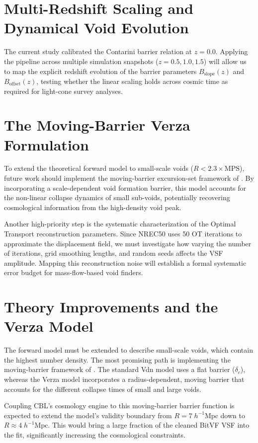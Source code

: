 \documentclass[12pt]{report}
\begin{document}
\section{Multi-Redshift Scaling and Dynamical Void Evolution}

The current study calibrated the Contarini barrier relation at $z=0.0$. Applying the pipeline across multiple simulation snapshots ($z = 0.5, 1.0, 1.5$) will allow us to map the explicit redshift evolution of the barrier parameters $B_{\mathrm{slope}}(z)$ and $B_{\mathrm{offset}}(z)$, testing whether the linear scaling holds across cosmic time as required for light-cone survey analyses.

\section{The Moving-Barrier Verza Formulation}

To extend the theoretical forward model to small-scale voids ($R < 2.3 \times \mathrm{MPS}$), future work should implement the moving-barrier excursion-set framework of \citet{Verza2024}. By incorporating a scale-dependent void formation barrier, this model accounts for the non-linear collapse dynamics of small sub-voids, potentially recovering cosmological information from the high-density void peak.

Another high-priority step is the systematic characterization of the Optimal Transport reconstruction parameters. Since NREC50 uses 50 OT iterations to approximate the displacement field, we must investigate how varying the number of iterations, grid smoothing lengths, and random seeds affects the VSF amplitude. Mapping this reconstruction noise will establish a formal systematic error budget for mass-flow-based void finders.

\section{Theory Improvements and the Verza Model}

The forward model must be extended to describe small-scale voids, which contain the highest number density. The most promising path is implementing the moving-barrier framework of \citet{Verza2024}. The standard Vdn model uses a flat barrier ($\delta_c$), whereas the Verza model incorporates a radius-dependent, moving barrier that accounts for the different collapse times of small and large voids. 

Coupling CBL's cosmology engine to this moving-barrier barrier function is expected to extend the model's validity boundary from $R = 7\;h^{-1}\mathrm{Mpc}$ down to $R \approx 4\;h^{-1}\mathrm{Mpc}$. This would bring a large fraction of the cleaned BitVF VSF into the fit, significantly increasing the cosmological constraints.
\end{document}
